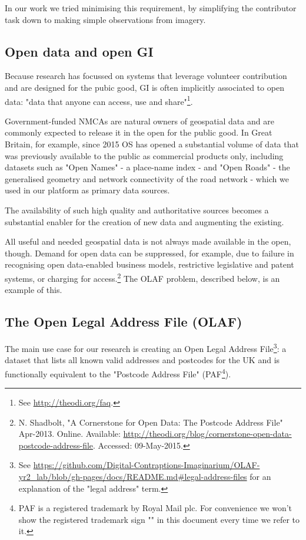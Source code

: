In our work we tried minimising this requirement, by simplifying the contributor task down to making simple observations from imagery.

\subsection{Open data and open GI}
\label{open-data-and-gi}

Because research has focussed on systems that leverage volunteer contribution and are designed for the pubic good, GI is often implicitly associated to open data: "data that anyone can access, use and share"\footnote{See \url{http://theodi.org/faq}.}. 

Government-funded NMCAs are natural owners of geospatial data and are commonly expected to release it in the open for the public good. In Great Britain, for example, since 2015 OS has opened a substantial volume of data that was previously available to the public as commercial products only, including datasets such as "Open Names" - a place-name index - and "Open Roads" - the generalised geometry and network connectivity of the road network - which we used in our platform as primary data sources.
	
The availability of such high quality and authoritative sources becomes a substantial enabler for the creation of new data and augmenting the existing.

All useful and needed geospatial data is not always made available in the open, though. Demand for open data can be suppressed, for example, due to failure in recognising open data-enabled business models, restrictive legislative and patent systems, or charging for access.\footnote{N. Shadbolt, "A Cornerstone for Open Data: The Postcode Address File" Apr-2013. Online. Available: \url{http://theodi.org/blog/cornerstone-open-data-postcode-address-file}. Accessed: 09-May-2015.} The OLAF problem, described below, is an example of this.
	
\subsection{The Open Legal Address File (OLAF)}
\label{subs:the-problem-of-creating-an-olaf}

The main use case for our research is creating an Open Legal Address File\footnote{See \url{https://github.com/Digital-Contraptions-Imaginarium/OLAF-yr2_lab/blob/gh-pages/docs/README.md#legal-address-files} for an explanation of the "legal address" term.}: a dataset that lists all known valid addresses and postcodes for the UK and is functionally equivalent to the "Postcode Address File" (PAF\footnote{PAF is a registered trademark by Royal Mail plc. For convenience we won't show the registered trademark sign "\textregistered" in this document every time we refer to it.}).

